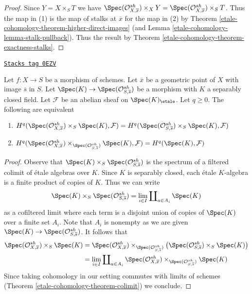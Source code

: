 \begin{proof}
Since $Y = X \times_S T$ we have
$\Spec(\mathcal{O}^{sh}_{X, \overline{x}}) \times_X Y =
\Spec(\mathcal{O}^{sh}_{X, \overline{x}}) \times_S T$. Thus
the map in (1) is the map of stalks at $\overline{x}$ for the map
in (2) by Theorem \ref{etale-cohomology-theorem-higher-direct-images} (and
Lemma \ref{etale-cohomology-lemma-stalk-pullback}).
Thus the result by Theorem \ref{etale-cohomology-theorem-exactness-stalks}.
\end{proof}

\begin{lemma}
\label{etale-cohomology-lemma-check-stalks-better}
\href{https://stacks.math.columbia.edu/tag/0EZV}{\texttt{Stacks tag 0EZV}}

Let $f : X \to S$ be a morphism of schemes.
Let $\overline{x}$ be a geometric point of $X$ with image $\overline{s}$ in $S$.
Let $\Spec(K) \to \Spec(\mathcal{O}^{sh}_{S, \overline{s}})$
be a morphism with $K$ a separably closed field. Let $\mathcal{F}$ be an
abelian sheaf on $\Spec(K)_\etale$. Let $q \geq 0$. The following are
equivalent
\begin{enumerate}
\item
$H^q(\Spec(\mathcal{O}^{sh}_{X, \overline{x}}) \times_S \Spec(K), \mathcal{F}) =
H^q(\Spec(\mathcal{O}^{sh}_{S, \overline{s}}) \times_S \Spec(K), \mathcal{F})$
\item
$H^q(\Spec(\mathcal{O}^{sh}_{X, \overline{x}})
\times_{\Spec(\mathcal{O}^{sh}_{S, \overline{s}})} \Spec(K), \mathcal{F}) =
H^q(\Spec(K), \mathcal{F})$
\end{enumerate}
\end{lemma}

\begin{proof}
Observe that $\Spec(K) \times_S \Spec(\mathcal{O}^{sh}_{S, \overline{s}})$
is the spectrum of a filtered colimit of \'etale algebras over $K$.
Since $K$ is separably closed, each \'etale $K$-algebra
is a finite product of copies of $K$. Thus we can write
$$
\Spec(K) \times_S \Spec(\mathcal{O}^{sh}_{S, \overline{s}}) =
\lim_{i \in I} \coprod\nolimits_{a \in A_i} \Spec(K)
$$
as a cofiltered limit where each term is a disjoint union
of copies of $\Spec(K)$ over a finite set $A_i$.
Note that $A_i$ is nonempty as we are given
$\Spec(K) \to \Spec(\mathcal{O}^{sh}_{S, \overline{s}})$.
It follows that
\begin{align*}
\Spec(\mathcal{O}^{sh}_{X, \overline{x}}) \times_S \Spec(K)
& =
\Spec(\mathcal{O}^{sh}_{X, \overline{x}})
\times_{\Spec(\mathcal{O}^{sh}_{S, \overline{s}})}
\left(
\Spec(\mathcal{O}^{sh}_{S, \overline{s}})
\times_S \Spec(K)\right) \\
& =
\lim_{i \in I} \coprod\nolimits_{a \in A_i}
\Spec(\mathcal{O}^{sh}_{X, \overline{x}})
\times_{\Spec(\mathcal{O}^{sh}_{S, \overline{s}})} \Spec(K)
\end{align*}
Since taking cohomology in our setting commutes with limits
of schemes (Theorem \ref{etale-cohomology-theorem-colimit}) we conclude.
\end{proof}


